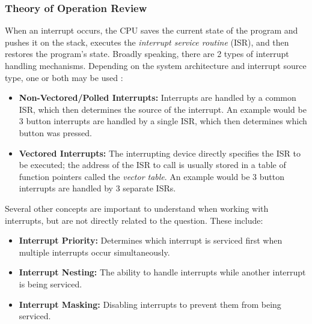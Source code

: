 \documentclass[main.tex]{subfiles}
\begin{document}
\subsubsection{Theory of Operation Review}
When an interrupt occurs, the CPU saves the current state of the program and pushes it on the stack, executes the \textit{interrupt service routine} (ISR), and then restores the program's state. \cite{white2024}
\newline
\newnoindentpara Broadly speaking, there are 2 types of interrupt handling mechanisms. Depending on the system architecture and interrupt source type, one or both may be used \cite{myersInterrupts}:
\begin{itemize}
    \item \textbf{Non-Vectored/Polled Interrupts:} Interrupts are handled by a common ISR, which then determines the source of the interrupt. An example would be 3 button interrupts are handled by a single ISR, which then determines which button was pressed.
    \item \textbf{Vectored Interrupts:} The interrupting device directly specifies the ISR to be executed; the address of the ISR to call is usually stored in a table of function pointers called the \textit{vector table}. An example would be 3 button interrupts are handled by 3 separate ISRs.
\end{itemize}

\newnoindentpara Several other concepts are important to understand when working with interrupts, but are not directly related to the question. These include:
\begin{itemize}
    \item \textbf{Interrupt Priority:} Determines which interrupt is serviced first when multiple interrupts occur simultaneously.
    \item \textbf{Interrupt Nesting:} The ability to handle interrupts while another interrupt is being serviced.
    \item \textbf{Interrupt Masking:} Disabling interrupts to prevent them from being serviced.
\end{itemize}
\end{document}
